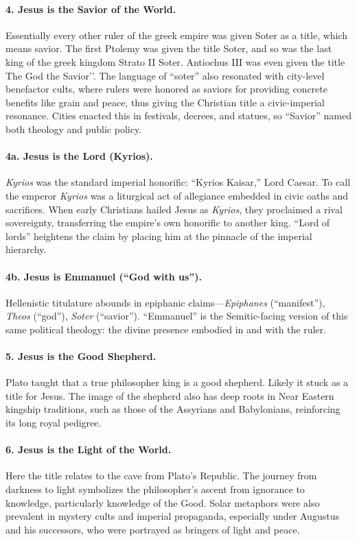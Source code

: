 \paragraph{4.
Jesus is the Savior of the World.}\label{par:jesus-is-the-savior-of-the-world.}
Essentially every other ruler of the greek empire was given Soter as a title, which means savior.
The first Ptolemy was given the title Soter, and so was the last king of the greek kingdom Strato II Soter.
Antiochus III was even given the title The God the Savior’’.
The language of “soter” also resonated with city-level benefactor cults, where rulers were honored as saviors for providing concrete benefits like grain and peace, thus giving the Christian title a civic-imperial resonance.
Cities enacted this in festivals, decrees, and statues, so “Savior” named both theology and public policy.
\paragraph{4a.
Jesus is the Lord (Kyrios).}\label{par:jesus-is-the-lord-kyrios}
\emph{Kyrios} was the standard imperial honorific: “Kyrios Kaisar,” Lord Caesar. To call the emperor \emph{Kyrios} was a liturgical act of allegiance embedded in civic oaths and sacrifices. When early Christians hailed Jesus as \emph{Kyrios}, they proclaimed a rival sovereignty, transferring the empire’s own honorific to another king. “Lord of lords” heightens the claim by placing him at the pinnacle of the imperial hierarchy.
\paragraph{4b.
Jesus is Emmanuel (“God with us”).}\label{par:jesus-is-emmanuel}
Hellenistic titulature abounds in epiphanic claims—\emph{Epiphanes} (“manifest”), \emph{Theos} (“god”), \emph{Soter} (“savior”).
“Emmanuel” is the Semitic-facing version of this same political theology: the divine presence embodied in and with the ruler.
\paragraph{5.
Jesus is the Good Shepherd.}\label{par:jesus-is-the-good-shepherd.}
Plato taught that a true philosopher king is a good shepherd.
Likely it stuck as a title for Jesus.
The image of the shepherd also has deep roots in Near Eastern kingship traditions, such as those of the Assyrians and Babylonians, reinforcing its long royal pedigree.

\paragraph{6.
Jesus is the Light of the World.}\label{par:jesus-is-the-light-of-the-world.}
Here the title relates to the cave from Plato’s Republic.
The journey from darkness to light symbolizes the philosopher’s ascent from ignorance to knowledge, particularly knowledge of the Good. Solar metaphors were also prevalent in mystery cults and imperial propaganda, especially under Augustus and his successors, who were portrayed as bringers of light and peace.
